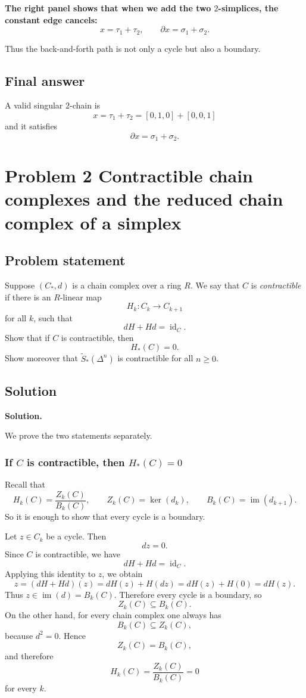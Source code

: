 \documentclass[12pt,a4paper]{article}
\theoremstyle{notespace}
\begin{document}
\textbf{The right panel shows that when we add the two \(2\)-simplices, the constant edge cancels:}
\[
x=\tau_1+\tau_2,
\qquad
\partial x=\sigma_1+\sigma_2.
\]

Thus the back-and-forth path is not only a cycle but also a boundary.

\subsection{Final answer}

A valid singular \(2\)-chain is
\[
\boxed{x=\tau_1+\tau_2=[0,1,0]+[0,0,1]}
\]
and it satisfies
\[
\boxed{\partial x=\sigma_1+\sigma_2.}
\]


\section{Problem 2 Contractible chain complexes and the reduced chain complex of a simplex}

\subsection{Problem statement}

Suppose \((C_*,d)\) is a chain complex over a ring \(R\). We say that \(C\) is \emph{contractible} if there is an \(R\)-linear map
\[
H_k : C_k \to C_{k+1}
\]
for all \(k\), such that
\[
dH + Hd = \operatorname{id}_C.
\]
Show that if \(C\) is contractible, then
\[
H_*(C)=0.
\]
Show moreover that \(\widetilde{S}_*(\Delta^n)\) is contractible for all \(n \ge 0\).

\subsection{Solution}

\textbf{Solution.}

We prove the two statements separately.

\subsubsection{If \(C\) is contractible, then \(H_*(C)=0\)}

Recall that
\[
H_k(C)=\frac{Z_k(C)}{B_k(C)},
\qquad
Z_k(C)=\ker(d_k),
\qquad
B_k(C)=\operatorname{im}(d_{k+1}).
\]
So it is enough to show that every cycle is a boundary.

Let \(z\in C_k\) be a cycle. Then
\[
dz=0.
\]
Since \(C\) is contractible, we have
\[
dH+Hd=\operatorname{id}_C.
\]
Applying this identity to \(z\), we obtain
\[
z=(dH+Hd)(z)=dH(z)+H(dz)=dH(z)+H(0)=dH(z).
\]
Thus \(z\in \operatorname{im}(d)=B_k(C)\). Therefore every cycle is a boundary, so
\[
Z_k(C)\subseteq B_k(C).
\]
On the other hand, for every chain complex one always has
\[
B_k(C)\subseteq Z_k(C),
\]
because \(d^2=0\). Hence
\[
Z_k(C)=B_k(C),
\]
and therefore
\[
H_k(C)=\frac{Z_k(C)}{B_k(C)}=0
\]
for every \(k\).
\end{document}
